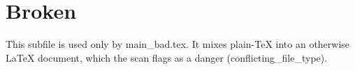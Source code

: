 \section{Broken}
This subfile is used only by main\_bad.tex. It mixes plain-TeX \bye into an
otherwise LaTeX document, which the scan flags as a danger
(conflicting_file_type).
\bye

